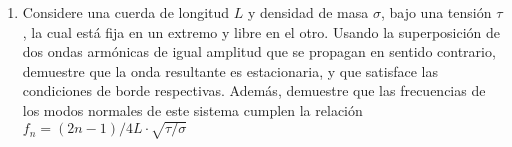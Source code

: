 \documentclass[letterpaper,11pt]{article}
\begin{document}
\begin{enumerate}
\item Considere una cuerda de longitud $L$ y densidad de masa $\sigma$, bajo una tensión $\tau$, la cual está fija en un extremo y libre en el otro. Usando la superposición de dos ondas armónicas de igual amplitud que se propagan en sentido contrario, demuestre que la onda resultante es estacionaria, y que satisface las condiciones de borde respectivas. Además, demuestre que las frecuencias de los modos normales de este sistema cumplen la relación $f_n = (2n-1)/4L \cdot \sqrt{\tau/\sigma}$

\end{enumerate}
\end{document}
